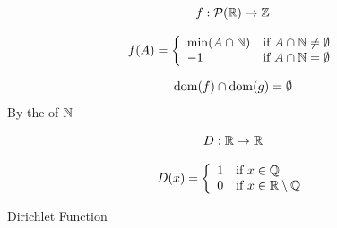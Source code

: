 \begin{frame}{}
  \begin{exampleblock}{}
    \[
      f: \mathcal{P}(\mathbb{R}) \to \mathbb{Z}
    \]

    \[
      f(A) = \left\{\begin{array}{ll}
        \min(A \cap \mathbb{N}) & \text{if } A \cap \mathbb{N} \neq \emptyset \\
          -1 & \text{if } A \cap \mathbb{N} = \emptyset
      \end{array}\right.
    \]
  \end{exampleblock}

  \pause
  \vspace{0.50cm}
  \begin{center}
    \[
      \text{\textup{dom}}(f) \cap \text{\textup{dom}}(g) = \emptyset
    \]
    By the  of $\mathbb{N}$
  \end{center}
\end{frame}

\begin{frame}{}
  \[
    D: \mathbb{R} \to \mathbb{R}
  \]

  \[
    D(x) = \left\{\begin{array}{ll}
      1 & \text{if } x \in \mathbb{Q} \\
      0 & \text{if } x \in \mathbb{R} \setminus \mathbb{Q}
    \end{array}\right.
  \]

  \vspace{0.60cm}
  \begin{center}
    {Dirichlet Function} \\[5pt]
  \end{center}
\end{frame}
